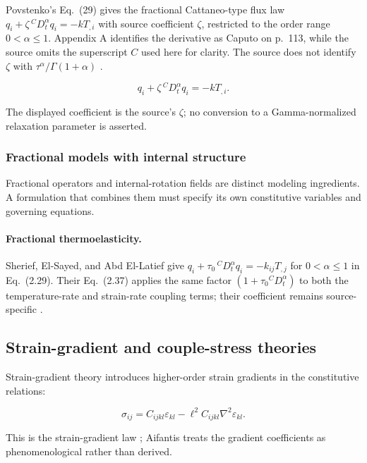 Povstenko’s Eq.~(29) gives the fractional Cattaneo-type flux law $q_i + \zeta\,{}^C D_t^\alpha q_i = -k T_{,i}$ with source coefficient $\zeta$, restricted to the order range $0<\alpha\leq1$. Appendix A identifies the derivative as Caputo on p.~113, while the source omits the superscript $C$ used here for clarity. The source does not identify $\zeta$ with $\tau^\alpha/\Gamma(1+\alpha)$ \cite{Povstenko2011Cattaneo}. 

\begin{equation}
q_i + \zeta\,{}^C D_t^\alpha q_i = -k T_{,i}.
\label{eq:11.4}
\end{equation}

The displayed coefficient is the source’s $\zeta$; no conversion to a Gamma-normalized relaxation parameter is asserted.

\subsubsection{Fractional models with internal structure}

Fractional operators and internal-rotation fields are distinct modeling ingredients. A formulation that combines them must specify its own constitutive variables and governing equations.

\paragraph{Fractional thermoelasticity.} Sherief, El-Sayed, and Abd El-Latief give $q_i+\tau_0\,{}^C D_t^\alpha q_i=-k_{ij}T_{,j}$ for $0<\alpha\leq1$ in Eq.~(2.29). Their Eq.~(2.37) applies the same factor $(1+\tau_0{}^C D_t^\alpha)$ to both the temperature-rate and strain-rate coupling terms; their coefficient remains source-specific \cite{Sherief2010Fractional}.

\subsection{Strain-gradient and couple-stress theories}
\label{sec:11.2}

Strain-gradient theory introduces higher-order strain gradients in the constitutive relations:

\begin{equation}
\sigma_{ij} = C_{ijkl}\varepsilon_{kl} - \ell^2 C_{ijkl}\nabla^2\varepsilon_{kl}.
\label{eq:11.5}
\end{equation}

This is the strain-gradient law \cite{Aifantis2003}; Aifantis treats the gradient coefficients as phenomenological rather than derived. 

